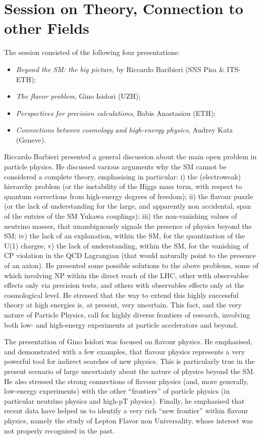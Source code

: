\section{Session on Theory, Connection to other Fields}\label{theory}



The session consisted of the following four presentations: 
\begin{itemize} \setlength{\itemsep}{-1ex}
\item {\em Beyond the SM: the big picture},  by  Riccardo Baribieri (SNS Pisa \& ITS-ETH); 
\item {\em  The flavor problem}, Gino Isidori (UZH); 
\item {\em  Perspectives for precision calculations}, Babis Anastasiou (ETH); 
\item {\em  Connections between cosmology and high-energy physics}, Andrey Katz (Geneve).
\end{itemize}

Riccardo Barbieri presented a general discussion about the main open problem in particle physics. 
He  discussed various arguments why the SM cannot be considered a complete theory,
emphasising in particular:  i) the (electroweak) hierarchy problem (or the instability of the Higgs mass term,
with respect to quantum corrections from high-energy degrees of freedom); 
ii) the flavour puzzle (or the lack of understanding for the large, 
and apparently non accidental,  span of the entries of the SM Yukawa couplings); 
iii) the non-vanishing values of neutrino masses, that unambiguously 
signals the presence of physics beyond the SM;
iv)  the lack  of an explanation, within the SM, for the quantization of the U(1) charges; 
v) the lack of understanding, within the SM, for the vanishing of CP 
violation in the QCD Lagrangian (that would naturally point to the presence of an axion).
He presented some possible solutions to the above problems, some of which involving 
NP within the direct reach of the LHC, other with observables effects only via precision
tests, and others with observables effects only at the cosmological level. 
He stressed  that the way to extend this highly successful theory 
at high energies is, at present, very uncertain.  This fact, and the very nature of Particle Physics,
call for highly diverse frontiers of research, involving both low- and high-energy experiments
at particle accelerators and beyond.

The presentation of Gino Isidori was focused on flavour physics. He emphasised, and 
demonstrated with a few examples, that flavour physics represents
a very powerful tool for indirect searches of new physics. This is particularly true in the 
present scenario of large uncertainty about the nature of physics beyond the SM. 
He also stressed the strong connections of flavour physics (and, more generally, low-energy experiments) 
with the other ``frontiers'' of particle physics (in particular neutrino physics and high-pT physics).
Finally, he emphasised that recent data have helped us to identify a very rich ``new frontier''
within flavour physics, namely the study of Lepton Flavor non Universality, whose interest 
was not properly recognised in the past. 

